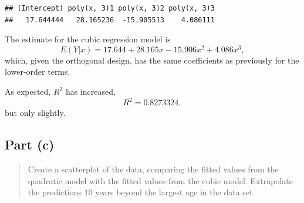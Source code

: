\documentclass[
]{article}
\newenvironment{Shaded}{\begin{snugshade}}{\end{snugshade}}
\newcommand{\FunctionTok}[1]{\textcolor[rgb]{0.13,0.29,0.53}{\textbf{#1}}}
\newcommand{\NormalTok}[1]{#1}
\newcommand{\OtherTok}[1]{\textcolor[rgb]{0.56,0.35,0.01}{#1}}
\newcommand{\SpecialCharTok}[1]{\textcolor[rgb]{0.81,0.36,0.00}{\textbf{#1}}}
\begin{document}
\begin{verbatim}
## (Intercept) poly(x, 3)1 poly(x, 3)2 poly(x, 3)3 
##   17.644444   28.165236  -15.905513    4.086111
\end{verbatim}

\begin{Shaded}
\end{Shaded}

The estimate for the cubic regression model is \[
  E(Y|x) = 17.644 + 28.165 x - 15.906 x^2 + 4.086 x^3,
\] which, given the orthogonal design, has the same coefficients as
previously for the lower-order terms.

As expected, \(R^2\) has increased, \[
  R^2 = 0.8273324,
\] but only slightly.

\hypertarget{part-c-1}{%
\subsection{Part (c)}\label{part-c-1}}

\begin{quote}
Create a scatterplot of the data, comparing the fitted values from the
quadratic model with the fitted values from the cubic model. Extrapolate
the predictions \(10\) years beyond the largest age in the data set.
\end{quote}
\end{document}

